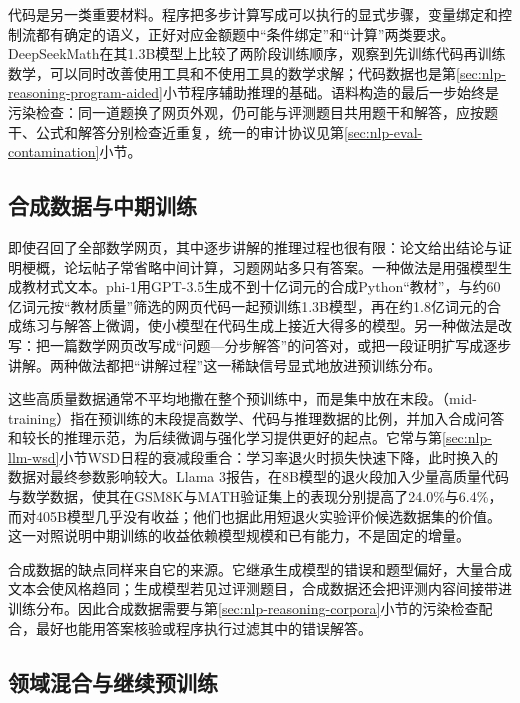 代码是另一类重要材料。程序把多步计算写成可以执行的显式步骤，变量绑定和控制流都有确定的语义，正好对应金额题中“条件绑定”和“计算”两类要求。DeepSeekMath在其1.3B模型上比较了两阶段训练顺序，观察到先训练代码再训练数学，可以同时改善使用工具和不使用工具的数学求解；代码数据也是第\ref{sec:nlp-reasoning-program-aided}小节程序辅助推理的基础。语料构造的最后一步始终是污染检查：同一道题换了网页外观，仍可能与评测题目共用题干和解答，应按题干、公式和解答分别检查近重复，统一的审计协议见第\ref{sec:nlp-eval-contamination}小节。

\subsection{合成数据与中期训练}
\label{sec:nlp-reasoning-midtraining}

即使召回了全部数学网页，其中逐步讲解的推理过程也很有限：论文给出结论与证明梗概，论坛帖子常省略中间计算，习题网站多只有答案。一种做法是用强模型生成教材式文本。phi-1用GPT-3.5生成不到十亿词元的合成Python“教材”，与约60亿词元按“教材质量”筛选的网页代码一起预训练1.3B模型，再在约1.8亿词元的合成练习与解答上微调，使小模型在代码生成上接近大得多的模型。另一种做法是改写：把一篇数学网页改写成“问题—分步解答”的问答对，或把一段证明扩写成逐步讲解。两种做法都把“讲解过程”这一稀缺信号显式地放进预训练分布。

这些高质量数据通常不平均地撒在整个预训练中，而是集中放在末段。（mid-training）指在预训练的末段提高数学、代码与推理数据的比例，并加入合成问答和较长的推理示范，为后续微调与强化学习提供更好的起点。它常与第\ref{sec:nlp-llm-wsd}小节WSD日程的衰减段重合：学习率退火时损失快速下降，此时换入的数据对最终参数影响较大。Llama 3报告，在8B模型的退火段加入少量高质量代码与数学数据，使其在GSM8K与MATH验证集上的表现分别提高了24.0\%与6.4\%，而对405B模型几乎没有收益；他们也据此用短退火实验评价候选数据集的价值。这一对照说明中期训练的收益依赖模型规模和已有能力，不是固定的增量。

合成数据的缺点同样来自它的来源。它继承生成模型的错误和题型偏好，大量合成文本会使风格趋同；生成模型若见过评测题目，合成数据还会把评测内容间接带进训练分布。因此合成数据需要与第\ref{sec:nlp-reasoning-corpora}小节的污染检查配合，最好也能用答案核验或程序执行过滤其中的错误解答。

\subsection{领域混合与继续预训练}
\label{sec:nlp-reasoning-domain-mixtures}

